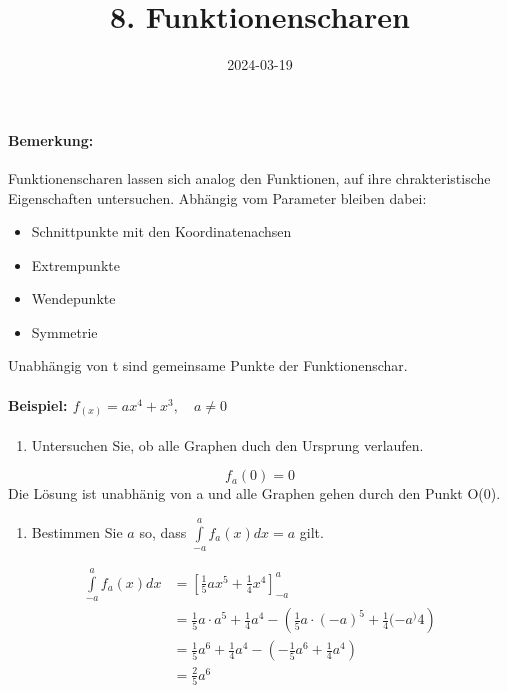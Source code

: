 \documentclass[
  letterpaper,
  DIV=11,
  numbers=noendperiod]{scrartcl}
\title{8. Funktionenscharen}
\author{}
\date{2024-03-19}
\let\oldparagraph\paragraph
\renewcommand{\paragraph}[1]{\oldparagraph{#1}\mbox{}}
\providecommand{\tightlist}{%
  \setlength{\itemsep}{0pt}\setlength{\parskip}{0pt}}\usepackage{longtable,booktabs,array}
\begin{document}
\maketitle

\paragraph{Bemerkung:}\label{bemerkung}

Funktionenscharen lassen sich analog den Funktionen, auf ihre
chrakteristische Eigenschaften untersuchen. Abhängig vom Parameter
bleiben dabei:

\begin{itemize}
\tightlist
\item
  Schnittpunkte mit den Koordinatenachsen
\item
  Extrempunkte
\item
  Wendepunkte
\item
  Symmetrie
\end{itemize}

Unabhängig von t sind gemeinsame Punkte der Funktionenschar.

\paragraph{\texorpdfstring{Beispiel:
\(f_(x)=ax^4+x^3, \quad a \neq 0\)}{Beispiel: f\_(x)=ax\^{}4+x\^{}3, \textbackslash quad a \textbackslash neq 0}}\label{beispiel-f_xax4x3-quad-a-neq-0}

\begin{enumerate}
\def\labelenumi{\arabic{enumi}.}
\tightlist
\item
  Untersuchen Sie, ob alle Graphen duch den Ursprung verlaufen.
\end{enumerate}

\[
f_a(0)= 0
\] Die Lösung ist unabhänig von a und alle Graphen gehen durch den Punkt
O(0).

\begin{enumerate}
\def\labelenumi{\arabic{enumi}.}
\setcounter{enumi}{1}
\tightlist
\item
  Bestimmen Sie \(a\) so, dass \(\int\limits_{-a}^{a} f_a(x)dx = a\)
  gilt.
\end{enumerate}

\[
\begin{aligned}
\int\limits_{-a}^{a} f_a(x)dx &= \left[\frac{1}{5}ax^5+\frac{1}{4}x^4  \right]_{-a}^a\\
&= \frac{1}{5}a\cdot a^5 + \frac{1}{4}a^4-\left( \frac{1}{5}a\cdot (-a)^5 + \frac{1}{4}(-a^)4\right)\\
&= \frac{1}{5}a^6 + \frac{1}{4}a^4 -\left(- \frac{1}{5}a^6+\frac{1}{4}a^4\right)\\
&=\frac{2}{5}a^6\\
\end{aligned}
\]
\end{document}
